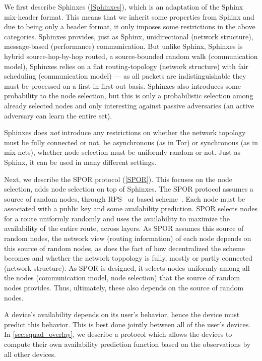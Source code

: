 We first describe Sphinxes (\cref{Sphinxes}), which is an adaptation of the 
Sphinx~\cite{Sphinx} mix-header format.
This means that we inherit some properties from Sphinx and due to being only a 
header format, it only imposes some restrictions in the above categories.
Sphinxes provides, just as Sphinx, unidirectional (network structure), 
message-based (performance) communication.
But unlike Sphinx, Sphinxes is hybrid source-hop-by-hop routed, a
source-bounded random walk (communication 
model),
Sphinxes relies on a flat routing-topology (network structure) with fair 
scheduling (communication model) --- as all packets are indistinguishable they 
must be processed on a first-in-first-out basis.
Sphinxes also introduces some probability to the node selection, but this is 
only a probabilistic selection among already selected nodes and only 
interesting against passive adversaries (an active  adversary can learn the 
entire set).

Sphinxes does \emph{not} introduce any restrictions on whether the network 
topology must be fully connected or not, be asynchronous (as in Tor) or 
synchronous (as in mix-nets), whether node selection must be uniformly random 
or not.
Just as Sphinx, it can be used in many different settings.

Next, we describe the \ac{SPOR} protocol (\cref{SPOR}).
This focuses on the node selection, \ie adds node selection on top of Sphinxes.
The \ac{SPOR} protocol assumes a source of random nodes, \eg through 
\ac{RPS}~\cite[\eg][]{BrahmsRPS} or  based 
scheme~\cite[\eg][]{Octopus}.
Each node must be associated with a public key and some availability 
prediction.
\Ac{SPOR} selects nodes for a route uniformly randomly and uses the 
availability to maximize the availability of the entire route, \ie across 
layers.
As \ac{SPOR} assumes this source of random nodes, the network view (routing 
information) of each node depends on this source of random nodes, as does the 
fact of how decentralized the scheme becomes and whether the network toppology 
is fully, mostly or partly connected (network structure).
As \ac{SPOR} is designed, it selects nodes uniformly among all the nodes 
(communication model, node selection) that the source of random nodes provides.
Thus, ultimately, these also depends on the source of random nodes.

A device's availability depends on its user's behavior, hence the device must 
predict this behavior.
This is best done jointly between all of the user's devices.
In \cref{sec:squad_overlay}, we describe a protocol which allows the devices to 
compute their own availability prediction function based on the observations by 
all other devices.

